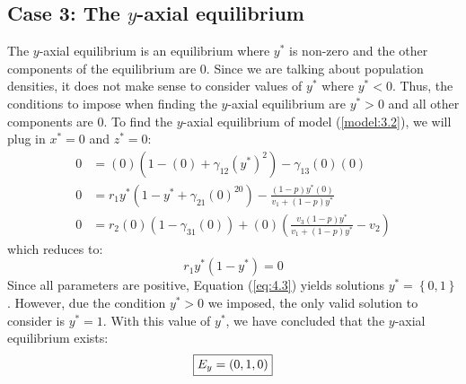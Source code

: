 \subsection{Case 3: The $y$-axial equilibrium}\label{subsec:y_axial_equilibrium}
The $y$-axial equilibrium is an equilibrium where $y^*$ is non-zero and the other components of the equilibrium are 0. Since we are talking about population densities, it does not make sense to consider values of $y^*$ where $y^*<0$. Thus, the conditions to impose when finding the $y$-axial equilibrium are $y^*>0$ and all other components are 0. To find the $y$-axial equilibrium of model (\ref{model:3.2}), we will plug in $x^*=0$ and $z^*=0$:
\begin{align*}
    0 &= (0)\left(1-(0)+\gamma_{12}\left(y^*\right)^2\right)-\gamma_{13}(0)(0)\\
    0 &= r_1y^*\left(1-y^*+\gamma_{21}(0)^20\right)-\frac{\left(1-p\right)y^*(0)}{v_1+\left(1-p\right)y^*}\\
    0 &= r_2(0)\left(1-\gamma_{31}(0)\right)+(0)\left(\frac{v_3\left(1-p\right)y^*}{v_1+\left(1-p\right)y^*}-v_2\right)
\end{align*}
which reduces to:
\begin{equation}
    r_1y^*\left(1-y^*\right)=0
    \label{eq:4.3}
\end{equation}
Since all parameters are positive, Equation (\ref{eq:4.3}) yields solutions $y^*=\left\{0, 1\right\}$. However, due the condition $y^*>0$ we imposed, the only valid solution to consider is $y^*=1$. With this value of $y^*$, we have concluded that the $y$-axial equilibrium exists:
\[
\fbox{$\displaystyle E_y=\left(
0,
1,
0
\right)$}
\]

